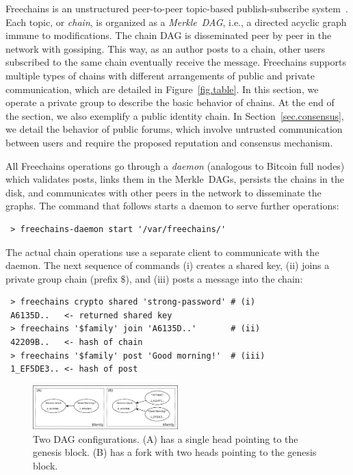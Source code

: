 \documentclass[10pt,journal,compsoc]{IEEEtran}
\newcommand{\FC}       {Freechains\xspace}
\begin{document}
\FC is an unstructured peer-to-peer topic-based publish-subscribe
system~\cite{fcs.sbseg20}.
Each topic, or \emph{chain}, is organized as a \emph{Merkle~DAG}, i.e., a
directed acyclic graph immune to modifications.
The chain DAG is disseminated peer by peer in the network with gossiping.
This way, as an author posts to a chain, other users subscribed to the same
chain eventually receive the message.
\FC supports multiple types of chains with different arrangements of public and
private communication, which are detailed in Figure~\ref{fig.table}.
In this section, we operate a private group to describe the basic behavior of
chains.
At the end of the section, we also exemplify a public identity chain.
In Section~\ref{sec.consensus}, we detail the behavior of public forums, which
involve untrusted communication between users and require the proposed
reputation and consensus mechanism.

All \FC operations go through a \emph{daemon} (analogous to Bitcoin full nodes)
which validates posts, links them in the Merkle~DAGs, persists the chains in
the disk, and communicates with other peers in the network to disseminate the
graphs.
The command that follows starts a daemon to serve further operations:

{\footnotesize
\begin{verbatim}
 > freechains-daemon start '/var/freechains/'
\end{verbatim}
}

The actual chain operations use a separate client to communicate with the
daemon.
The next sequence of commands (i) creates a shared key, (ii) joins a private
group chain (prefix $\$$), and (iii) posts a message into the chain:

{\footnotesize
\begin{verbatim}
 > freechains crypto shared 'strong-password' # (i)
 A6135D..   <- returned shared key
 > freechains '$family' join 'A6135D..'       # (ii)
 42209B..   <- hash of chain
 > freechains '$family' post 'Good morning!'  # (iii)
 1_EF5DE3.. <- hash of post
\end{verbatim}
}

\begin{figure}
\centering
\includegraphics[width=0.5\textwidth]{family.png}
\caption{Two DAG configurations. (A) has a single head pointing to the
genesis block. (B) has a fork with two heads pointing to the genesis block.}
\label{fig.family}
\end{figure}
\end{document}
